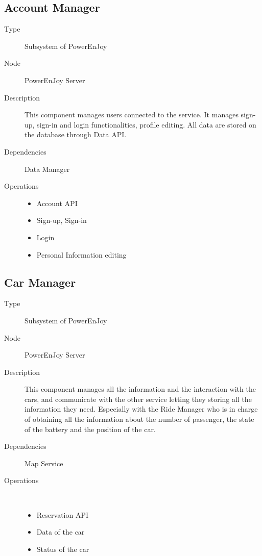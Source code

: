 \subsection{Account Manager}
\begin{description}
	\item[Type] Subsystem of PowerEnJoy
	\item[Node] PowerEnJoy Server
	\item[Description] This component manages users connected to the service. It manages sign-up, sign-in and login functionalities, profile editing. All data are stored on the database through Data API.
	\item[Dependencies] Data Manager
	\item[Operations] 
		\begin{itemize}
			\item Account API
			\item Sign-up, Sign-in
			\item Login  
			\item Personal Information editing 
	\end{itemize}
\end{description}

\subsection{Car Manager}
\begin{description}
	\item[Type] Subsystem of PowerEnJoy
	\item[Node] PowerEnJoy Server
	\item[Description] This component manages all the information and the interaction with the cars, and communicate with the other service letting they storing all the information they need. Especially  with the Ride Manager who is in charge of obtaining all the information about the number of passenger, the state of the battery and the position of the car.
	\item[Dependencies] Map Service
	\item[Operations] \ \\
		\begin{itemize}
			\item Reservation API
			\item Data of the car
			\item Status of the car   
	\end{itemize}
\end{description}


